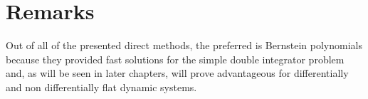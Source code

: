 \section{Remarks}

\par Out of all of the presented direct methods, the preferred is Bernstein polynomials because they provided fast solutions for the simple double integrator problem and, as will be seen in later chapters, will prove advantageous for differentially and non differentially flat dynamic systems.
